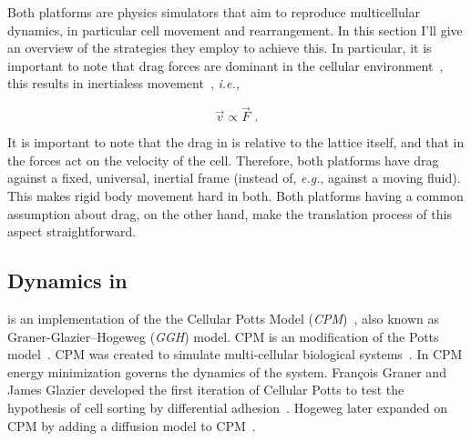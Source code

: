 

Both platforms are physics simulators that aim to reproduce multicellular dynamics,
in particular cell movement and rearrangement.
In this section I'll give an overview of the strategies they employ to achieve this. In particular, it is important to note that drag forces are dominant in the cellular environment~\cite{ghaffarizadeh_physicell_2018}, this results in inertialess movement~\cite{ghaffarizadeh_physicell_2018}, \textit{i.e.,}  


\begin{equation}\label{eq:abm:aristotle-said-nothing-wrong}
    \Vec{v} \propto \Vec{F}\,\,.
\end{equation}


It is important to note that the drag in \ccds is relative to the lattice itself, and that in \pscs the forces act on the velocity of the cell. Therefore, both platforms have drag against a fixed, universal, inertial frame (instead of, \textit{e.g.}, against a moving fluid). This makes rigid body movement hard in both. Both platforms having a common assumption about drag, on the other hand, make the translation process of this aspect straightforward.


\subsection{Dynamics in \ccd}\label{sec:abm:cpm-history}

\ccds is an implementation of the the Cellular Potts Model (\textit{CPM})~\cite{graner1992simulation, savill_modelling_1997}, also known as Graner-Glazier–Hogeweg (\textit{GGH}) model. CPM is an modification of the Potts model~\cite{potts1952some,graner1992simulation}. CPM was created to simulate multi-cellular biological systems~\cite{graner1992simulation}. In CPM energy minimization governs the dynamics of the system. François Graner and James Glazier developed the first iteration of Cellular Potts to test the hypothesis of cell sorting by differential adhesion~\cite{graner1992simulation}. Hogeweg later expanded on CPM by adding a diffusion model to CPM~\cite{savill_modelling_1997}.

